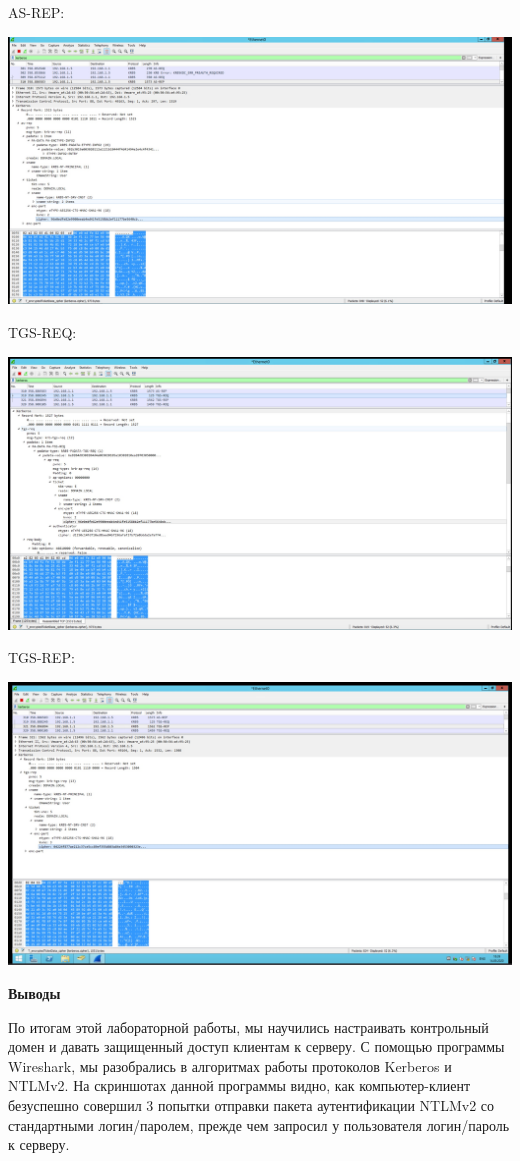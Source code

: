 \documentclass[a4paper,14pt]{extarticle}
\begin{document}
    AS-REP:
    \vspace{-2em}
    \begin{center}
        \includegraphics[scale=0.22]{pics/AS-REP.jpg}
    \end{center}
    \newpage
    \noindent TGS-REQ:
    \begin{center}
        \includegraphics[scale=0.22]{pics/TGS-REQ.jpg}
    \end{center}
    TGS-REP:
    \vspace{-2em}
    \begin{center}
        \includegraphics[scale=0.22]{pics/TGS-REP.jpg}
    \end{center}
    \newpage
    \textbf{Выводы}

    По итогам этой лабораторной работы, мы научились настраивать контрольный 
    домен и давать защищенный доступ клиентам к серверу. С помощью 
    программы Wireshark, мы разобрались в алгоритмах работы протоколов 
    Kerberos и NTLMv2. На скриншотах данной программы видно, как 
    компьютер-клиент безуспешно совершил 3 попытки отправки пакета 
    аутентификации NTLMv2 со стандартными логин/паролем, прежде чем запросил 
    у пользователя логин/пароль к серверу. 
    
\end{document}
